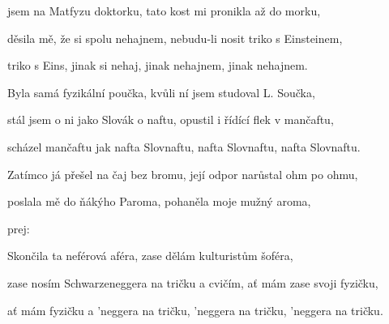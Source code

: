

\zs
{} jsem na Matfyzu doktorku,
tato kost mi pronikla až do morku,

děsila mě, že si spolu nehajnem,
nebudu-li nosit triko s Einsteinem,

triko s Eins, jinak si nehaj,
jinak nehajnem, jinak nehajnem.
\ks

\zs
Byla samá fyzikální poučka,
kvůli ní jsem studoval L. Součka,

stál jsem o ni jako Slovák o naftu,
opustil i řídící flek v mančaftu,

scházel mančaftu jak nafta Slovnaftu,
nafta Slovnaftu, nafta Slovnaftu.
\ks

\zs
Zatímco já přešel na čaj bez bromu,
její odpor narůstal ohm po ohmu,

poslala mě do ňákýho Paroma,
pohaněla moje mužný aroma,

prej: 
\ks

\zs
Skončila ta neférová aféra,
zase dělám kulturistům šoféra,

zase nosím Schwarzeneggera na tričku
a cvičím, ať mám zase svoji fyzičku,

ať mám fyzičku a 'neggera na tričku,
'neggera na tričku, 'neggera na tričku.
\ks

\kp























